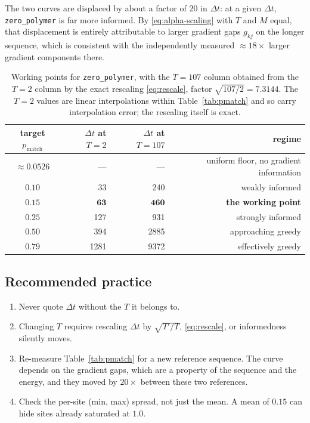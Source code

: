 \documentclass[11pt,a4paper]{article}
\newcommand{\dt}{\Delta t}
\newcommand{\pmatch}{p_{\mathrm{match}}}
\newcommand{\Mass}{M}
\begin{document}
The two curves are displaced by about a factor of $20$ in $\dt$: at a given
$\dt$, \texttt{zero\_polymer} is far more informed. By
\eqref{eq:alpha-scaling} with $T$ and $\Mass$ equal, that displacement is
entirely attributable to larger gradient gaps $g_{kj}$ on the longer sequence,
which is consistent with the independently measured $\approx\!18\times$ larger
gradient components there.

\begin{table}[htbp]
\centering
\begin{tabular}{c rr r}
\toprule
target $\pmatch$ & $\dt$ at $T=2$ & $\dt$ at $T=107$ & regime \\
\midrule
$\approx 0.0526$ & ---   & ---    & uniform floor, no gradient information \\
$0.10$           &   33  &   240  & weakly informed \\
$\mathbf{0.15}$  & $\mathbf{63}$ & $\mathbf{460}$ & \textbf{the working point} \\
$0.25$           &  127  &   931  & strongly informed \\
$0.50$           &  394  &  2885  & approaching greedy \\
$0.79$           & 1281  &  9372  & effectively greedy \\
\bottomrule
\end{tabular}
\caption{Working points for \texttt{zero\_polymer}, with the $T=107$ column
obtained from the $T=2$ column by the exact rescaling \eqref{eq:rescale},
factor $\sqrt{107/2}=7.3144$. The $T=2$ values are linear interpolations
within Table~\ref{tab:pmatch} and so carry interpolation error; the rescaling
itself is exact.}
\label{tab:working-points}
\end{table}

\subsection{Recommended practice}

\begin{enumerate}
  \item Never quote $\dt$ without the $T$ it belongs to.
  \item Changing $T$ requires rescaling $\dt$ by $\sqrt{T'/T}$,
        \eqref{eq:rescale}, or informedness silently moves.
  \item Re-measure Table~\ref{tab:pmatch} for a new reference sequence. The
        curve depends on the gradient gaps, which are a property of the
        sequence and the energy, and they moved by $20\times$ between these
        two references.
  \item Check the per-site (min, max) spread, not just the mean. A mean of
        $0.15$ can hide sites already saturated at $1.0$.
\end{enumerate}
\end{document}
